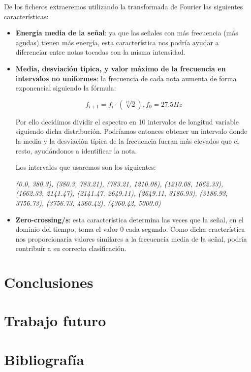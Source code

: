 \documentclass[12pt]{article}
\begin{document}
\bigskip
De los ficheros extraeremos utilizando la transformada de Fourier las siguientes características: 
\begin{itemize}
	\item \textbf{Energia media de la señal}: ya que las señales con más frecuencia (más agudas) tienen más energía, esta característica nos podría
		ayudar a diferenciar entre notas tocadas con la misma intensidad.
	\item \textbf{Media, desviación tipica, y valor máximo de la frecuencia en intervalos no uniformes}: la frecuencia de cada nota
		aumenta de forma exponencial siguiendo la fórmula:

		\begin{equation}
			f_{i+1} = f_{i}\cdot(\sqrt[12]{2}), f_0 = 27.5 Hz
		\end{equation}

		Por ello decidimos dividir el espectro en 10 intervalos de longitud variable siguiendo dicha distribución. 
		Podríamos entonces obtener un intervalo donde la media y la desviación típica de la frecuencia fueran más elevados que el resto,
		ayudándonos a identificar la nota.
		
		Los intervalos que usaremos son los siguientes:
		
		\textit{(0.0, 380.3), (380.3, 783.21), (783.21, 1210.08), (1210.08, 1662.33),\newline
		(1662.33, 2141.47), (2141.47, 2649.11), (2649.11, 3186.93), (3186.93, 3756.73), 
		(3756.73, 4360.42), (4360.42, 5000.0)}
	\item \textbf{Zero-crossing/s}: esta característica determina las veces que la señal, en el dominio del tiempo, toma el valor 0 cada segundo.
		Como dicha cracterística nos proporcionaría valores similares a la frecuencia media de la señal, podría contribuír a su correcta clasificación.
\end{itemize}

\section{Conclusiones}
\label{Conclusiones}

\section{Trabajo futuro}
\label{Trabajo futuro}

\section{Bibliografía}
\label{Bibliografía}
\end{document}
